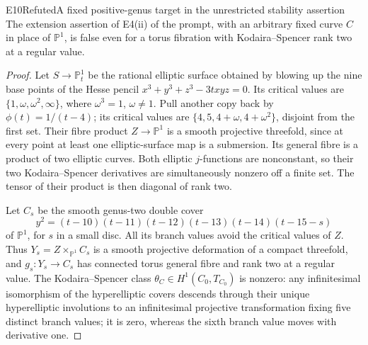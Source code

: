 
\begin{statement}{E10}{Refuted}{A fixed positive-genus target in the unrestricted stability assertion}
The extension assertion of E4(ii) of the prompt, with an arbitrary
fixed curve $C$ in place of $\mathbb P^1$, is false even for a torus
fibration with Kodaira--Spencer rank two at a regular value.
\end{statement}
\begin{proof}
Let $S\to\mathbb P^1_t$ be the rational elliptic surface obtained
by blowing up the nine base points of the Hesse pencil
$x^3+y^3+z^3-3txyz=0$. Its critical values are
$\{1,\omega,\omega^2,\infty\}$, where $\omega^3=1$, $\omega\ne1$.
Pull another copy back by $\phi(t)=1/(t-4)$; its critical values
are $\{4,5,4+\omega,4+\omega^2\}$, disjoint from the first set.
Their fibre product $Z\to\mathbb P^1$ is a smooth projective
threefold, since at every point at least one elliptic-surface
map is a submersion. Its general fibre is a product of two
elliptic curves. Both elliptic $j$-functions are nonconstant,
so their two Kodaira--Spencer derivatives are simultaneously
nonzero off a finite set. The tensor of their product is then
diagonal of rank two.

Let $C_s$ be the smooth genus-two double cover
\[
 y^2=(t-10)(t-11)(t-12)(t-13)(t-14)(t-15-s)
\]
of $\mathbb P^1$, for $s$ in a small disc. All its branch values
avoid the critical values of $Z$. Thus
$Y_s=Z\times_{\mathbb P^1}C_s$ is a smooth projective deformation
of a compact threefold, and $g_s:Y_s\to C_s$ has connected torus
general fibre and rank two at a regular value. The Kodaira--Spencer
class $\theta_C\in H^1(C_0,T_{C_0})$ is nonzero: any infinitesimal
isomorphism of the hyperelliptic covers descends through their
unique hyperelliptic involutions to an infinitesimal projective
transformation fixing five distinct branch values; it is zero,
whereas the sixth branch value moves with derivative one.


\end{proof}
